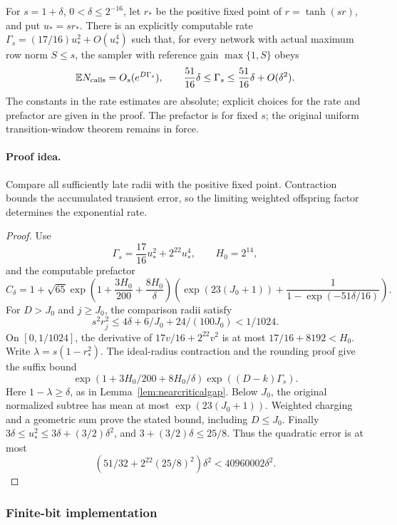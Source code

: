 \begin{proposition}
\label{prop:fusedrate}
For \(s=1+\delta\), \(0<\delta\le2^{-16}\), let
\(r_*\) be the positive fixed point of \(r=\tanh(sr)\), and
put $u_*=sr_*$. There is an explicitly computable rate
$\Gamma_s=(17/16)u_*^2+O(u_*^4)$ such that, for every network
with actual maximum row norm $S\le s$, the sampler with reference
gain $\max\{1,S\}$ obeys
\[
 \mathbb E N_{\rm calls}=O_s(e^{D\Gamma_s}),\qquad
 \frac{51}{16}\delta\le\Gamma_s
 \le\frac{51}{16}\delta+O(\delta^2).
\]
The constants in the rate estimates are absolute; explicit choices
for the rate and prefactor are given in the proof.
The prefactor is for fixed \(s\); the original uniform
transition-window theorem remains in force.
\end{proposition}
\paragraph{Proof idea.}
Compare all sufficiently late radii with the positive fixed point.
Contraction bounds the accumulated transient error, so the limiting weighted
offspring factor determines the exponential rate.

\begin{proof}
Use
\[
 \Gamma_s=\frac{17}{16}u_*^2+2^{22}u_*^4,\qquad H_0=2^{14},
\]
and the computable prefactor
\[
 C_\delta=1+\sqrt{65}
 \exp\left(1+\frac{3H_0}{200}+\frac{8H_0}{\delta}\right)
 \left(\exp(23(J_0+1))+
                  \frac1{1-\exp(-51\delta/16)}\right).
\]
For \(D>J_0\) and \(j\ge J_0\), the comparison radii satisfy
\[
 s^2r_j^2\le4\delta+6/J_0+24/(100J_0)<1/1024.
\]
On \([0,1/1024]\), the derivative of
\(17v/16+2^{22}v^2\) is at most
\(17/16+8192<H_0\).
Write \(\lambda=s(1-r_*^2)\).  The ideal-radius contraction
and the rounding proof give the suffix bound
\[
 \exp\left(1+3H_0/200+8H_0/\delta\right)
 \exp((D-k)\Gamma_s).
\]
Here \(1-\lambda\ge\delta\), as in
Lemma~\ref{lem:nearcriticalgap}.  Below \(J_0\), the
original normalized subtree has mean at most
\(\exp(23(J_0+1))\).  Weighted charging and a geometric sum
prove the stated bound, including \(D\le J_0\).
Finally
\(3\delta\le u_*^2\le3\delta+(3/2)\delta^2\), and
\(3+(3/2)\delta\le25/8\).  Thus the quadratic error is at
most
\[
 \left(51/32+2^{22}(25/8)^2\right)\delta^2
 <40960002\delta^2.
\]
\end{proof}

\subsubsection{Finite-bit implementation}

